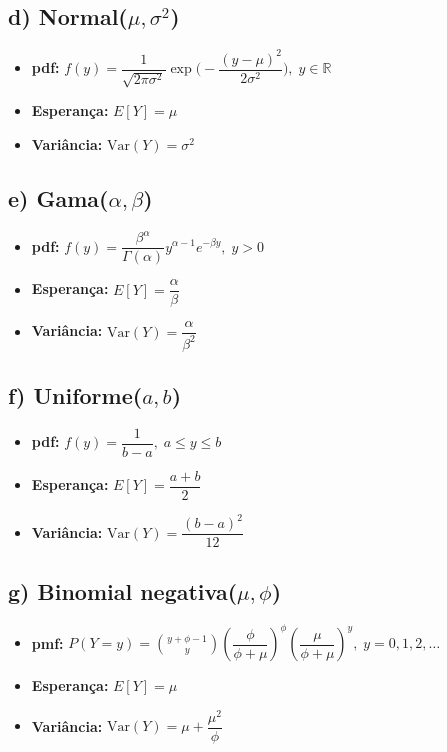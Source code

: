 \documentclass[a4paper,12pt]{article}
\begin{document}
\subsection*{d) Normal($\mu,\sigma^2$)}
\begin{itemize}
\item \textbf{pdf:} $f(y)=\dfrac{1}{\sqrt{2\pi\sigma^2}}\exp\!\Big(-\dfrac{(y-\mu)^2}{2\sigma^2}\Big),\; y\in\mathbb{R}$
\item \textbf{Esperança:} $E[Y]=\mu$
\item \textbf{Variância:} $\mathrm{Var}(Y)=\sigma^2$
\end{itemize}

\subsection*{e) Gama($\alpha,\beta$)}
\begin{itemize}
\item \textbf{pdf:} $f(y)=\dfrac{\beta^{\alpha}}{\Gamma(\alpha)}y^{\alpha-1}e^{-\beta y},\; y>0$
\item \textbf{Esperança:} $E[Y]=\dfrac{\alpha}{\beta}$
\item \textbf{Variância:} $\mathrm{Var}(Y)=\dfrac{\alpha}{\beta^2}$
\end{itemize}

\subsection*{f) Uniforme($a,b$)}
\begin{itemize}
\item \textbf{pdf:} $f(y)=\dfrac{1}{b-a},\; a\le y\le b$
\item \textbf{Esperança:} $E[Y]=\dfrac{a+b}{2}$
\item \textbf{Variância:} $\mathrm{Var}(Y)=\dfrac{(b-a)^2}{12}$
\end{itemize}

\subsection*{g) Binomial negativa($\mu,\phi$)}
\begin{itemize}
\item \textbf{pmf:} $P(Y=y)=\binom{y+\phi-1}{y}\left(\dfrac{\phi}{\phi+\mu}\right)^{\phi}\left(\dfrac{\mu}{\phi+\mu}\right)^{y},\; y=0,1,2,\dots$
\item \textbf{Esperança:} $E[Y]=\mu$
\item \textbf{Variância:} $\mathrm{Var}(Y)=\mu+\dfrac{\mu^2}{\phi}$
\end{itemize}
\end{document}
